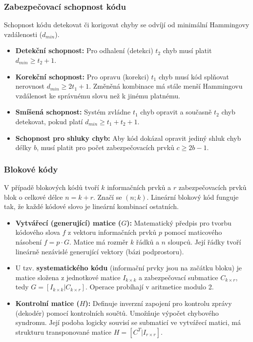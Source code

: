     \subsubsection{Zabezpečovací schopnost kódu}
        Schopnost kódu detekovat či korigovat chyby se odvíjí od minimální Hammingovy vzdálenosti ($d_{min}$).
        \begin{itemize}
            \item \textbf{Detekční schopnost:} Pro odhalení (detekci) $t_2$ chyb musí platit $d_{min} \ge t_2 + 1$.
            \item \textbf{Korekční schopnost:} Pro opravu (korekci) $t_1$ chyb musí kód splňovat nerovnost $d_{min} \ge 2t_1 + 1$. Změněná kombinace má stále menší Hammingovu vzdálenost ke správnému slovu než k jinému platnému.
            \item \textbf{Smíšená schopnost:} Systém zvládne $t_1$ chyb opravit a současně $t_2$ chyb detekovat, pokud platí $d_{min} \ge t_1 + t_2 + 1$.
            \item \textbf{Schopnost pro shluky chyb:} Aby kód dokázal opravit jediný shluk chyb délky $b$, musí platit pro počet zabezpečovacích prvků $c \ge 2b - 1$.
        \end{itemize}
    \subsubsection{Blokové kódy}
        V případě blokových kódů tvoří $k$ informačních prvků a $r$ zabezpečovacích prvků blok o celkové délce $n = k + r$. Značí se $(n; k)$. Lineární blokový kód funguje tak, že každé kódové slovo je lineární kombinací ostatních.
        
        \begin{itemize}
            \item \textbf{Vytvářecí (generující) matice ($G$):} Matematický předpis pro tvorbu kódového slova $f$ z vektoru informačních prvků $p$ pomocí maticového násobení $f = p \cdot G$. Matice má rozměr $k$ řádků a $n$ sloupců. Její řádky tvoří lineárně nezávislé generující vektory (bázi podprostoru).
            \item U tzv. \textbf{systematického kódu} (informační prvky jsou na začátku bloku) je matice složena z jednotkové matice $I_{k \times k}$ a zabezpečovací submatice $C_{k \times r}$, tedy $G = [I_{k \times k} | C_{k \times r}]$. Operace probíhají v aritmetice modulo 2.
            \item \textbf{Kontrolní matice ($H$):} Definuje inverzní zapojení pro kontrolu zprávy (dekodér) pomocí kontrolních součtů. Umožňuje výpočet chybového syndromu. Její podoba logicky souvisí se submaticí ve vytvářecí matici, má strukturu transponované matice $H = [C^T | I_{r \times r}]$.
        \end{itemize}
